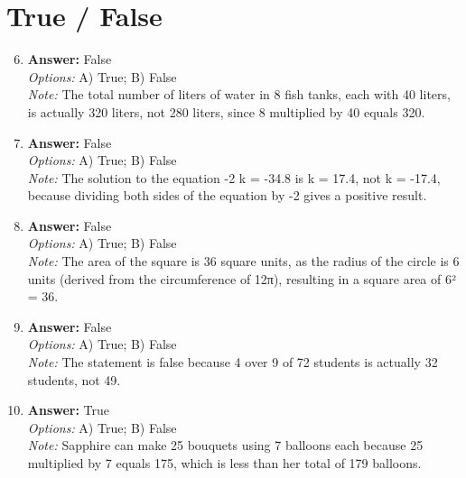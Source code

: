 \documentclass[12pt]{article}
\begin{document}
\section*{True / False}
\begin{enumerate}[label=\arabic*.]
\setcounter{enumi}{5}
\item \textbf{Answer:} False
\\ \textit{Options:} A) True; B) False
\\ \textit{Note:} The total number of liters of water in 8 fish tanks, each with 40 liters, is actually 320 liters, not 280 liters, since 8 multiplied by 40 equals 320.
\item \textbf{Answer:} False
\\ \textit{Options:} A) True; B) False
\\ \textit{Note:} The solution to the equation -2 k = -34.8 is k = 17.4, not k = -17.4, because dividing both sides of the equation by -2 gives a positive result.
\item \textbf{Answer:} False
\\ \textit{Options:} A) True; B) False
\\ \textit{Note:} The area of the square is 36 square units, as the radius of the circle is 6 units (derived from the circumference of 12π), resulting in a square area of 6² = 36.
\item \textbf{Answer:} False
\\ \textit{Options:} A) True; B) False
\\ \textit{Note:} The statement is false because 4 over 9 of 72 students is actually 32 students, not 49.
\item \textbf{Answer:} True
\\ \textit{Options:} A) True; B) False
\\ \textit{Note:} Sapphire can make 25 bouquets using 7 balloons each because 25 multiplied by 7 equals 175, which is less than her total of 179 balloons.
\end{enumerate}
\end{document}
